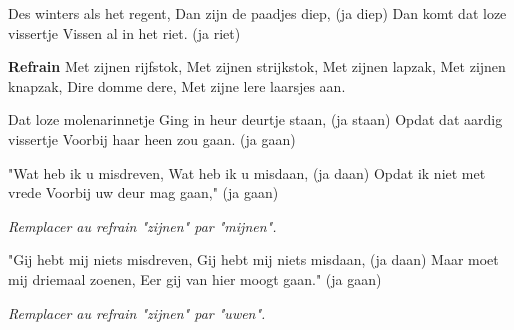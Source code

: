 \footnotemark [
ititle={Loze vissertje, het}]


\beginverse
Des winters als het regent,
Dan zijn de paadjes diep, (ja diep)
Dan komt dat loze vissertje
Vissen al in het riet. (ja riet)
\endverse

\beginchorus
\textbf{Refrain}
Met zijnen rijfstok,
Met zijnen strijkstok,
Met zijnen lapzak,
Met zijnen knapzak,
{Dire domme dere,}
{Met zijne lere laarsjes aan.}
\endchorus

\beginverse
Dat loze molenarinnetje
Ging in heur deurtje staan, (ja staan)
Opdat dat aardig vissertje
Voorbij haar heen zou gaan. (ja gaan)
\endverse

\beginverse
"Wat heb ik u misdreven,
Wat heb ik u misdaan, (ja daan)
Opdat ik niet met vrede
Voorbij uw deur mag gaan," (ja gaan)
\endverse

\emph{Remplacer au refrain "zijnen" par "mijnen".}

\beginverse
"Gij hebt mij niets misdreven,
Gij hebt mij niets misdaan, (ja daan)
Maar moet mij driemaal zoenen,
Eer gij van hier moogt gaan." (ja gaan)
\endverse

\emph{Remplacer au refrain "zijnen" par "uwen".}
\endsong